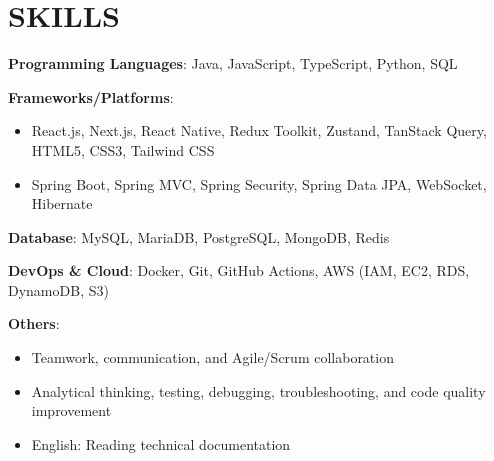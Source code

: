 \section{SKILLS}
\resumeSubHeadingListStart

  \item
    \resumeItemListStart
      \item \textbf{Programming Languages}: Java, JavaScript, TypeScript, Python, SQL
      \item \textbf{Frameworks/Platforms}:
        \begin{itemize}
          \item React.js, Next.js, React Native, Redux Toolkit, Zustand, TanStack Query, HTML5, CSS3, Tailwind CSS
          \item Spring Boot, Spring MVC, Spring Security, Spring Data JPA, WebSocket, Hibernate
        \end{itemize}
      \item \textbf{Database}: MySQL, MariaDB, PostgreSQL, MongoDB, Redis
      \item \textbf{DevOps \& Cloud}: Docker, Git, GitHub Actions, AWS (IAM, EC2, RDS, DynamoDB, S3)
      \item \textbf{Others}:
        \begin{itemize}
          \item Teamwork, communication, and Agile/Scrum collaboration
          \item Analytical thinking, testing, debugging, troubleshooting, and code quality improvement
          \item English: Reading technical documentation
        \end{itemize}
    \resumeItemListEnd

\resumeSubHeadingListEnd
